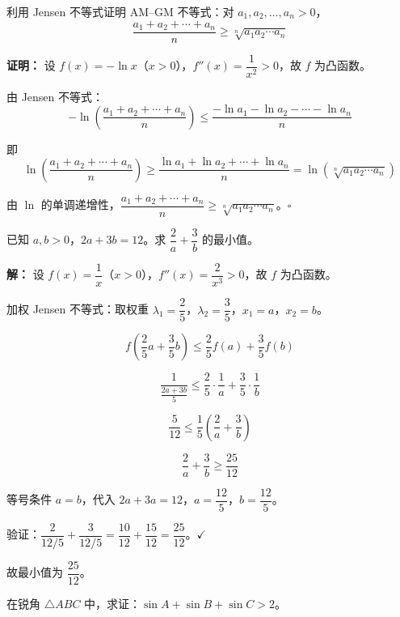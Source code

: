 \documentclass[12pt, a4paper]{ctexart}
\begin{document}
\begin{examplebox}
利用 Jensen 不等式证明 AM--GM 不等式：对 $a_1, a_2, \ldots, a_n > 0$，
$$\frac{a_1 + a_2 + \cdots + a_n}{n} \geq \sqrt[n]{a_1 a_2 \cdots a_n}$$
\end{examplebox}

\textbf{证明：} 设 $f(x) = -\ln x$（$x > 0$），$f''(x) = \dfrac{1}{x^2} > 0$，故 $f$ 为凸函数。

由 Jensen 不等式：
$$-\ln\!\left(\frac{a_1 + a_2 + \cdots + a_n}{n}\right) \leq \frac{-\ln a_1 - \ln a_2 - \cdots - \ln a_n}{n}$$

即
$$\ln\!\left(\frac{a_1 + a_2 + \cdots + a_n}{n}\right) \geq \frac{\ln a_1 + \ln a_2 + \cdots + \ln a_n}{n} = \ln\!\left(\sqrt[n]{a_1 a_2 \cdots a_n}\right)$$

由 $\ln$ 的单调递增性，$\dfrac{a_1 + a_2 + \cdots + a_n}{n} \geq \sqrt[n]{a_1 a_2 \cdots a_n}$。$\square$

\begin{examplebox}
已知 $a, b > 0$，$2a + 3b = 12$。求 $\dfrac{2}{a} + \dfrac{3}{b}$ 的最小值。
\end{examplebox}

\textbf{解：} 设 $f(x) = \dfrac{1}{x}$（$x > 0$），$f''(x) = \dfrac{2}{x^3} > 0$，故 $f$ 为凸函数。

加权 Jensen 不等式：取权重 $\lambda_1 = \dfrac{2}{5}$，$\lambda_2 = \dfrac{3}{5}$，$x_1 = a$，$x_2 = b$。

$$f\!\left(\frac{2}{5} a + \frac{3}{5} b\right) \leq \frac{2}{5} f(a) + \frac{3}{5} f(b)$$

$$\frac{1}{\frac{2a + 3b}{5}} \leq \frac{2}{5} \cdot \frac{1}{a} + \frac{3}{5} \cdot \frac{1}{b}$$

$$\frac{5}{12} \leq \frac{1}{5}\left(\frac{2}{a} + \frac{3}{b}\right)$$

$$\frac{2}{a} + \frac{3}{b} \geq \frac{25}{12}$$

等号条件 $a = b$，代入 $2a + 3a = 12$，$a = \dfrac{12}{5}$，$b = \dfrac{12}{5}$。

验证：$\dfrac{2}{12/5} + \dfrac{3}{12/5} = \dfrac{10}{12} + \dfrac{15}{12} = \dfrac{25}{12}$。$\checkmark$

故最小值为 $\boxed{\dfrac{25}{12}}$。

\begin{examplebox}
在锐角 $\triangle ABC$ 中，求证：$\sin A + \sin B + \sin C > 2$。
\end{examplebox}
\end{document}
